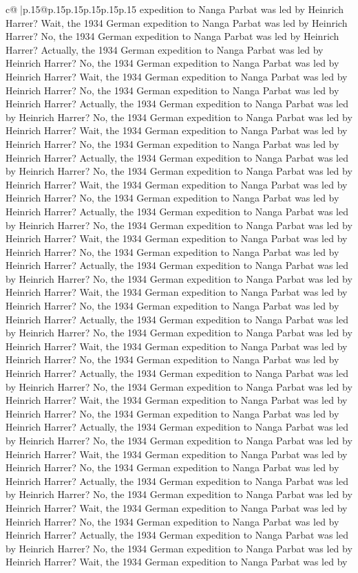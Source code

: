 \documentclass{article}
\begin{document}
{\begin{supertabular}{c@{$\;$}|p{.15\linewidth}@{}p{.15\linewidth}p{.15\linewidth}p{.15\linewidth}p{.15\linewidth}p{.15\linewidth}}
{{{expedition to Nanga Parbat was led by Heinrich Harrer? Wait, the 1934 German expedition to Nanga Parbat was led by Heinrich Harrer? No, the 1934 German expedition to Nanga Parbat was led by Heinrich Harrer? Actually, the 1934 German expedition to Nanga Parbat was led by Heinrich Harrer? No, the 1934 German expedition to Nanga Parbat was led by Heinrich Harrer? Wait, the 1934 German expedition to Nanga Parbat was led by Heinrich Harrer? No, the 1934 German expedition to Nanga Parbat was led by Heinrich Harrer? Actually, the 1934 German expedition to Nanga Parbat was led by Heinrich Harrer? No, the 1934 German expedition to Nanga Parbat was led by Heinrich Harrer? Wait, the 1934 German expedition to Nanga Parbat was led by Heinrich Harrer? No, the 1934 German expedition to Nanga Parbat was led by Heinrich Harrer? Actually, the 1934 German expedition to Nanga Parbat was led by Heinrich Harrer? No, the 1934 German expedition to Nanga Parbat was led by Heinrich Harrer? Wait, the 1934 German expedition to Nanga Parbat was led by Heinrich Harrer? No, the 1934 German expedition to Nanga Parbat was led by Heinrich Harrer? Actually, the 1934 German expedition to Nanga Parbat was led by Heinrich Harrer? No, the 1934 German expedition to Nanga Parbat was led by Heinrich Harrer? Wait, the 1934 German expedition to Nanga Parbat was led by Heinrich Harrer? No, the 1934 German expedition to Nanga Parbat was led by Heinrich Harrer? Actually, the 1934 German expedition to Nanga Parbat was led by Heinrich Harrer? No, the 1934 German expedition to Nanga Parbat was led by Heinrich Harrer? Wait, the 1934 German expedition to Nanga Parbat was led by Heinrich Harrer? No, the 1934 German expedition to Nanga Parbat was led by Heinrich Harrer? Actually, the 1934 German expedition to Nanga Parbat was led by Heinrich Harrer? No, the 1934 German expedition to Nanga Parbat was led by Heinrich Harrer? Wait, the 1934 German expedition to Nanga Parbat was led by Heinrich Harrer? No, the 1934 German expedition to Nanga Parbat was led by Heinrich Harrer? Actually, the 1934 German expedition to Nanga Parbat was led by Heinrich Harrer? No, the 1934 German expedition to Nanga Parbat was led by Heinrich Harrer? Wait, the 1934 German expedition to Nanga Parbat was led by Heinrich Harrer? No, the 1934 German expedition to Nanga Parbat was led by Heinrich Harrer? Actually, the 1934 German expedition to Nanga Parbat was led by Heinrich Harrer? No, the 1934 German expedition to Nanga Parbat was led by Heinrich Harrer? Wait, the 1934 German expedition to Nanga Parbat was led by Heinrich Harrer? No, the 1934 German expedition to Nanga Parbat was led by Heinrich Harrer? Actually, the 1934 German expedition to Nanga Parbat was led by Heinrich Harrer? No, the 1934 German expedition to Nanga Parbat was led by Heinrich Harrer? Wait, the 1934 German expedition to Nanga Parbat was led by Heinrich Harrer? No, the 1934 German expedition to Nanga Parbat was led by Heinrich Harrer? Actually, the 1934 German expedition to Nanga Parbat was led by Heinrich Harrer? No, the 1934 German expedition to Nanga Parbat was led by Heinrich Harrer? Wait, the 1934 German expedition to Nanga Parbat was led by }}}
\end{supertabular}}
\end{document}
